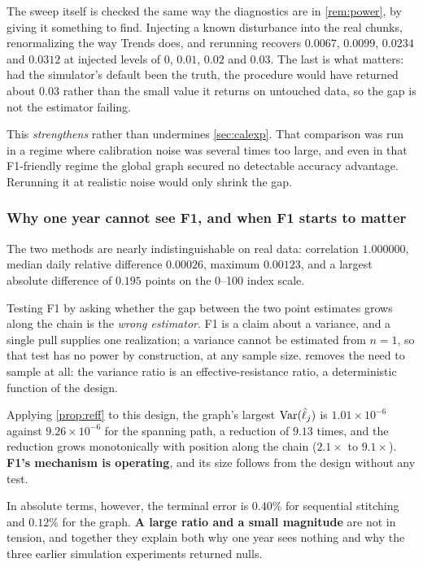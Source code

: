 \documentclass[12pt,a4paper,oneside]{article}
\begin{document}
The sweep itself is checked the same way the diagnostics are in \cref{rem:power},
by giving it something to find. Injecting a known disturbance into the real
chunks, renormalizing the way Trends does, and rerunning recovers $0.0067$,
$0.0099$, $0.0234$ and $0.0312$ at injected levels of $0$, $0.01$, $0.02$ and
$0.03$. The last is what matters: had the simulator's default been the truth, the
procedure would have returned about $0.03$ rather than the small value it returns
on untouched data, so the gap is not the estimator failing.

This \emph{strengthens} rather than undermines \cref{sec:calexp}. That comparison
was run in a regime where calibration noise was several times too large, and even
in that F1-friendly regime the global graph secured no detectable accuracy
advantage. Rerunning it at realistic noise would only shrink the gap.

\subsubsection{Why one year cannot see F1, and when F1 starts to matter}

The two methods are nearly indistinguishable on real data: correlation
$1.000000$, median daily relative difference $0.00026$, maximum $0.00123$, and a
largest absolute difference of $0.195$ points on the 0--100 index scale.

\begin{remark}\label{rem:n1}
Testing F1 by asking whether the gap between the two point estimates grows along
the chain is the \emph{wrong estimator}. F1 is a claim about a variance, and a
single pull supplies one realization; a variance cannot be estimated from
$n = 1$, so that test has no power by construction, at any sample size.
 removes the need to sample at all: the variance ratio is an
effective-resistance ratio, a deterministic function of the design.
\end{remark}

Applying \cref{prop:reff} to this design, the graph's largest
$\operatorname{Var}(\hat\ell_j)$ is $1.01 \times 10^{-6}$ against $9.26 \times 10^{-6}$ for the
spanning path, a reduction of $\mathbf{9.13}$ times, and the reduction grows
monotonically with position along the chain ($2.1\times$ to $9.1\times$).
\textbf{F1's mechanism is operating}, and its size follows from the design
without any test.

In absolute terms, however, the terminal error is $0.40\%$ for sequential
stitching and $0.12\%$ for the graph. \textbf{A large ratio and a small
magnitude} are not in tension, and together they explain both why one year sees
nothing and why the three earlier simulation experiments returned nulls.
\end{document}
